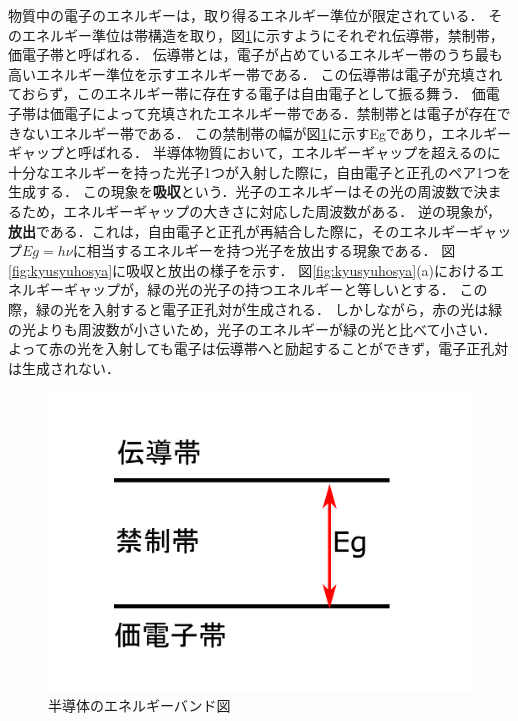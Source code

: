 物質中の電子のエネルギーは，取り得るエネルギー準位が限定されている．
そのエネルギー準位は帯構造を取り，図\ref{fig:eg}に示すようにそれぞれ伝導帯，禁制帯，価電子帯と呼ばれる．
伝導帯とは，電子が占めているエネルギー帯のうち最も高いエネルギー準位を示すエネルギー帯である．
この伝導帯は電子が充填されておらず，このエネルギー帯に存在する電子は自由電子として振る舞う．
価電子帯は価電子によって充填されたエネルギー帯である．禁制帯とは電子が存在できないエネルギー帯である．
この禁制帯の幅が図\ref{fig:eg}に示すEgであり，エネルギーギャップと呼ばれる．
半導体物質において，エネルギーギャップを超えるのに十分なエネルギーを持った光子1つが入射した際に，自由電子と正孔のペア1つを生成する．
この現象を{\bf 吸収}という．光子のエネルギーはその光の周波数で決まるため，エネルギーギャップの大きさに対応した周波数がある．
逆の現象が，{\bf 放出}である．これは，自由電子と正孔が再結合した際に，そのエネルギーギャップ$Eg=h \nu$に相当するエネルギーを持つ光子を放出する現象である．
図\ref{fig:kyusyuhosya}に吸収と放出の様子を示す．
図\ref{fig:kyusyuhosya}(a)におけるエネルギーギャップが，緑の光の光子の持つエネルギーと等しいとする．
この際，緑の光を入射すると電子正孔対が生成される．
しかしながら，赤の光は緑の光よりも周波数が小さいため，光子のエネルギーが緑の光と比べて小さい．
よって赤の光を入射しても電子は伝導帯へと励起することができず，電子正孔対は生成されない．
\begin{figure}[t!]
\begin{center}
\includegraphics[keepaspectratio,scale=0.4]{fig/3/Eg.pdf}
\caption{半導体のエネルギーバンド図}
\label{fig:eg}
\end{center}
\end{figure}
